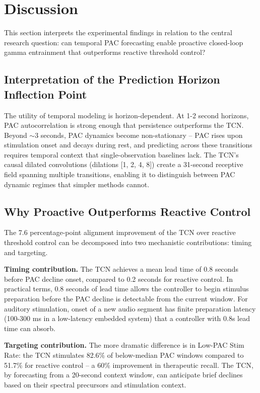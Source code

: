 \documentclass[11pt,letterpaper]{article}
\begin{document}
\section{Discussion}

This section interprets the experimental findings in relation to the central research question: can temporal PAC forecasting enable proactive closed-loop gamma entrainment that outperforms reactive threshold control?

\subsection{Interpretation of the Prediction Horizon Inflection Point}

The utility of temporal modeling is horizon-dependent. At 1-2 second horizons, PAC autocorrelation is strong enough that persistence outperforms the TCN. Beyond $\sim$3 seconds, PAC dynamics become non-stationary -- PAC rises upon stimulation onset and decays during rest, and predicting across these transitions requires temporal context that single-observation baselines lack. The TCN's causal dilated convolutions (dilations [1, 2, 4, 8]) create a 31-second receptive field spanning multiple transitions, enabling it to distinguish between PAC dynamic regimes that simpler methods cannot.

\subsection{Why Proactive Outperforms Reactive Control}

The 7.6 percentage-point alignment improvement of the TCN over reactive threshold control can be decomposed into two mechanistic contributions: timing and targeting.

\textbf{Timing contribution.} The TCN achieves a mean lead time of 0.8 seconds before PAC decline onset, compared to 0.2 seconds for reactive control. In practical terms, 0.8 seconds of lead time allows the controller to begin stimulus preparation before the PAC decline is detectable from the current window. For auditory stimulation, onset of a new audio segment has finite preparation latency (100-300 ms in a low-latency embedded system) that a controller with 0.8s lead time can absorb.

\textbf{Targeting contribution.} The more dramatic difference is in Low-PAC Stim Rate: the TCN stimulates 82.6\% of below-median PAC windows compared to 51.7\% for reactive control -- a 60\% improvement in therapeutic recall. The TCN, by forecasting from a 20-second context window, can anticipate brief declines based on their spectral precursors and stimulation context.
\end{document}
